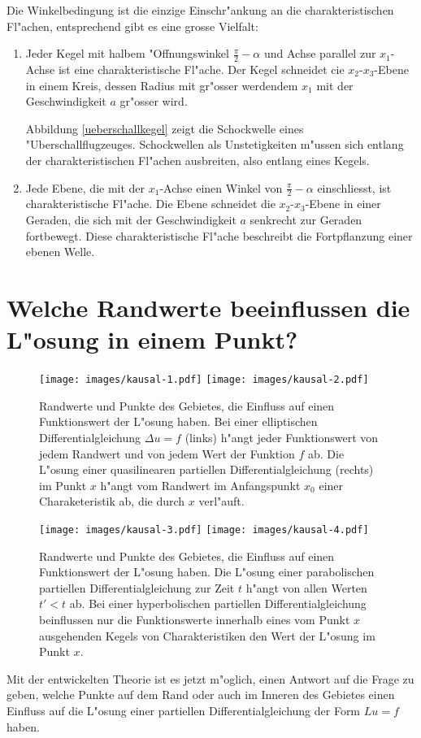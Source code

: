 Die Winkelbedingung ist die einzige Einschr"ankung an
die charakteristischen Fl"achen,  entsprechend gibt es eine
grosse Vielfalt:
\begin{enumerate}
\item
Jeder Kegel mit halbem "Offnungswinkel $\frac{\pi}2-\alpha$
und Achse parallel zur $x_1$-Achse ist eine charakteristische Fl"ache.
Der Kegel schneidet cie $x_2$-$x_3$-Ebene in einem Kreis, dessen Radius mit
gr"osser werdendem $x_1$ mit der Geschwindigkeit $a$ gr"osser wird.

Abbildung \ref{ueberschallkegel}
zeigt die Schockwelle eines "Uberschallflugzeuges. Schockwellen
als Unstetigkeiten m"ussen sich entlang der charakteristischen Fl"achen ausbreiten,
also entlang eines Kegels.
\item 
Jede Ebene, die mit der $x_1$-Achse einen Winkel von $\frac\pi2-\alpha$
einschliesst, ist charakteristische Fl"ache.
Die Ebene schneidet die $x_2$-$x_3$-Ebene in einer Geraden, die sich
mit der Geschwindigkeit $a$ senkrecht zur Geraden fortbewegt.
Diese charakteristische Fl"ache beschreibt die Fortpflanzung einer
ebenen Welle.
\end{enumerate}


\section{Welche Randwerte beeinflussen die L"osung in einem Punkt?}
\begin{figure}
\centering
\texttt{[image: images/kausal-1.pdf]}\qquad\qquad%
\texttt{[image: images/kausal-2.pdf]}
\caption{Randwerte und Punkte des Gebietes, die Einfluss auf einen
Funktionswert der L"osung haben.
Bei einer elliptischen Differentialgleichung $\Delta u=f$
(links)
h"angt jeder Funktionswert von jedem Randwert und von jedem Wert der
Funktion $f$ ab.
Die L"osung einer quasilinearen partiellen Differentialgleichung  (rechts)
im Punkt $x$ h"angt vom Randwert im Anfangspunkt $x_0$ einer Charaketeristik
ab, die durch $x$ verl"auft.
\label{einflussmenge1}}
\end{figure}
\begin{figure}
\centering
\texttt{[image: images/kausal-3.pdf]}\qquad\qquad%
\texttt{[image: images/kausal-4.pdf]}
\caption{Randwerte und Punkte des Gebietes, die Einfluss auf einen
Funktionswert der L"osung haben.
Die L"osung einer parabolischen partiellen Differentialgleichung
zur Zeit $t$ h"angt von allen Werten $t'<t$ ab.
Bei einer hyperbolischen partiellen Differentialgleichung beinflussen 
nur die Funktionswerte innerhalb eines vom Punkt $x$ ausgehenden Kegels
von Charakteristiken den Wert der L"osung im Punkt $x$.
\label{einflussmenge2}}
\end{figure}
Mit der entwickelten Theorie ist es jetzt m"oglich, einen Antwort auf die
Frage zu geben, welche Punkte auf dem Rand oder auch im Inneren des Gebietes
einen Einfluss auf die L"osung einer partiellen Differentialgleichung
der Form $Lu=f$ haben.

